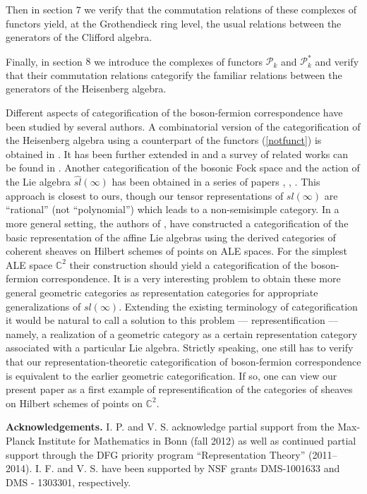 \documentclass[11pt]{amsart}
\begin{document}
Then in section $7$ we verify that the commutation relations of these complexes of functors yield, at the Grothendieck ring level,
the usual relations between the generators of the Clifford algebra.

Finally, in section $8$ we introduce the complexes of functors $\mathcal{P}_k$ and $\mathcal{P}_k^*$ and verify that their commutation
relations categorify the familiar relations between the generators of the Heisenberg algebra.

Different aspects of categorification of the boson-fermion correspondence have been studied by several authors. A combinatorial 
version of the categorification of the Heisenberg algebra using a counterpart of the functors (\ref{notfunct}) is obtained
in \cite{K2}. It has been further extended in \cite{LS1} and a survey of related works can be found in \cite{LS2}. Another 
categorification of the bosonic Fock space and the action of the Lie algebra $\widehat{sl}(\infty)$ 
has been obtained in a series of papers \cite{HY1}, \cite{HTY}, \cite{HY2}. This approach is 
closest to ours, though our tensor representations of $sl(\infty)$ are ``rational'' (not ``polynomial'') which leads to a non-semisimple 
category. In a more general setting, the authors of \cite{CL1}, \cite{CL2} have constructed
a categorification of the basic representation of the affine Lie algebras using the derived categories of coherent
sheaves on Hilbert schemes of points on ALE spaces. For the simplest ALE space $\mathbb{C}^2$ their construction should yield
a categorification of the boson-fermion correspondence. It is a very interesting problem to obtain these more general 
geometric categories as representation categories for appropriate generalizations of $sl(\infty)$. Extending the 
existing terminology of categorification it would be natural to call a solution to this problem --- representification ---
namely, a realization of a geometric category as a certain representation category associated with a particular Lie algebra. 
Strictly speaking, one still has to verify that our representation-theoretic categorification of boson-fermion correspondence is equivalent to the earlier
geometric categorification. If so, one can view  our present paper as a first example of representification of the categories of sheaves on Hilbert
schemes of points on $\mathbb{C}^2$.  

{\bf Acknowledgements.} I. P. and V. S. acknowledge partial support from the Max-Planck Institute for Mathematics in Bonn (fall 2012) as well as continued 
partial support through the DFG priority program ``Representation Theory'' (2011--2014).  I. F. and V. S. have been supported by NSF grants  DMS-1001633
and DMS - 1303301, respectively.
\end{document}
